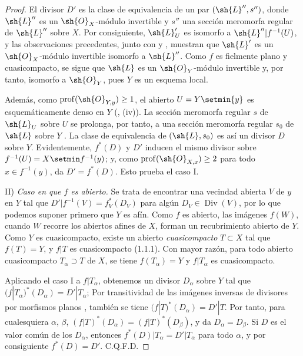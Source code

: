 \begin{proof}
El divisor $D'$ es la clase de equivalencia de un par
$(\sh{L}'',s'')$, donde $\sh{L}''$ es un $\sh{O}_X$-módulo invertible
y $s''$ una sección meromorfa regular de $\sh{L}''$ sobre $X$.
Por consiguiente, $\sh{L}'_U$ es isomorfo a
$\sh{L}''|f^{-1}(U)$, y las observaciones precedentes, junto con
{} y {}, muestran que $\sh{L}'$ es un
$\sh{O}_X$-módulo invertible isomorfo a $\sh{L}''$. Como $f$ es
fielmente plano y cuasicompacto, se sigue que $\sh{L}$ es un
$\sh{O}_Y$-módulo invertible {} y, por tanto, isomorfo a $\sh{O}_Y$, pues
$Y$ es un esquema local.

Además, como $\operatorname{prof}(\sh{O}_{Y,y})\geq1$, el abierto
$U=Y\setmin\{y\}$ es esquemáticamente denso en $Y$
({}, (iv)). La sección meromorfa regular $s$ de $\sh{L}_U$
sobre $U$ se prolonga, por tanto, a una sección meromorfa regular $s_0$ de
$\sh{L}$ sobre $Y$ {}. La clase de equivalencia de
$(\sh{L},s_0)$ es así un divisor $D$ sobre $Y$. Evidentemente, $f^*(D)$ y
$D'$ inducen el mismo divisor sobre
$f^{-1}(U)=X\setmin f^{-1}(y)$; y, como
$\operatorname{prof}(\sh{O}_{X,x})\geq2$ para todo
$x\in f^{-1}(y)$, {} da $D'=f^*(D)$. Esto prueba el caso I.

\textup{II)} \emph{Caso en que $f$ es abierto.}
Se trata de encontrar una vecindad abierta $V$ de $y$ en $Y$ tal
que $D'|f^{-1}(V)=f_V^*(D_V)$ para algún
$D_V\in\operatorname{Div}(V)$, por lo que podemos suponer primero que $Y$ es afín.
Como $f$ es abierto, las imágenes $f(W)$, cuando $W$ recorre los
abiertos afines de $X$, forman un recubrimiento abierto de $Y$. Como $Y$
es cuasicompacto, existe un abierto \emph{cuasicompacto} $T\subset X$
tal que $f(T)=Y$, y $f|T$ es cuasicompacto (1.1.1). Con mayor razón,
para todo abierto cuasicompacto $T_\alpha\supset T$ de $X$,
se tiene
$f(T_\alpha)=Y$ y $f|T_\alpha$ es cuasicompacto.

Aplicando el caso I a $f|T_\alpha$, obtenemos un divisor $D_\alpha$ sobre
$Y$ tal que
$(f|T_\alpha)^*(D_\alpha)=D'|T_\alpha$;
Por transitividad de las imágenes inversas de divisores por morfismos planos
{}, también se tiene
$(f|T)^*(D_\alpha)=D'|T$. Por tanto, para cualesquiera $\alpha$, $\beta$,
$(f|T)^*(D_\alpha)=(f|T)^*(D_\beta)$,
y {} da $D_\alpha=D_\beta$. Si $D$ es el valor común de los $D_\alpha$, entonces $f^*(D)|T_\alpha=D'|T_\alpha$ para todo $\alpha$, y
por consiguiente $f^*(D)=D'$. C.Q.F.D.
\end{proof}

